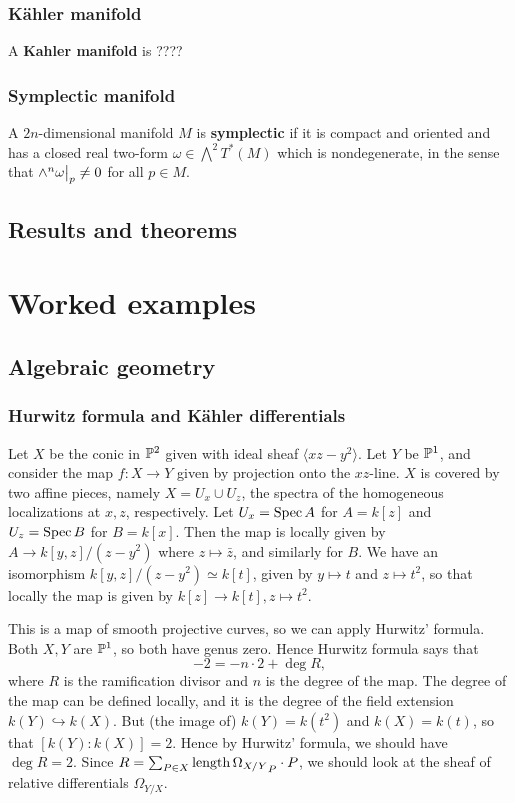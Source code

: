 \documentclass[11pt, english]{article}
\begin{document}
\subsubsection{Kähler manifold}
\label{kahlermanifold}

A \textbf{Kahler manifold} is ????

\subsubsection{Symplectic manifold}
\label{symplectic}

A $2n$-dimensional manifold $M$ is \textbf{symplectic} if it is compact and oriented and has a closed real two-form $\omega \in \bigwedge^2 T^\ast(M)$ which is nondegenerate, in the sense that $\restr{\wedge^n \omega}{p} \neq 0$ for all $p \in M$.

\subsection{Results and theorems}

\section{Worked examples}
\subsection{Algebraic geometry}

\subsubsection{Hurwitz formula and Kähler differentials}
\label{exhurwitz}

Let $X$ be the conic in $\mathbb{P}^2$ given with ideal sheaf $\langle xz-y^2 \rangle$. Let $Y$ be $\mathbb{P}^1$, and consider the map $f:X \to Y$ given by projection onto the $xz$-line. $X$ is covered by two affine pieces, namely $X= U_x \cup U_z$, the spectra of the homogeneous localizations at $x,z$, respectively. Let $U_x=\operatorname{Spec} A$ for $A=k[z]$ and $U_z = \operatorname{Spec} B$ for $B=k[x]$. Then the map is locally given by $A \to k[y,z]/(z-y^2)$ where $z \mapsto \bar z$, and similarly for $B$. We have an isomorphism $k[y,z]/(z-y^2) \simeq k[t]$, given by $y \mapsto t$ and $z \mapsto t^2$, so that locally the map is given by $k[z] \to k[t], z \mapsto t^2$.

This is a map of smooth projective curves, so we can apply Hurwitz' formula. Both $X,Y$ are $\mathbb{P}^1$, so both have genus zero. Hence Hurwitz formula says that
\[
-2 = -n \cdot 2+ \deg R,
\]
where $R$ is the ramification divisor and $n$ is the degree of the map. The degree of the map can be defined locally, and it is the degree of the field extension $k(Y) \hookrightarrow k(X)$. But (the image of) $k(Y) = k(t^2)$ and $k(X)=k(t)$, so that $[k(Y):k(X)]=2$. Hence by Hurwitz' formula, we should have $\deg R = 2$. Since $R = \sum_{P \in X} \mathrm{length} \, {\Omega_{X/Y}}_P \cdot P$, we should look at the sheaf of relative differentials $\Omega_{Y/X}$.
\end{document}
